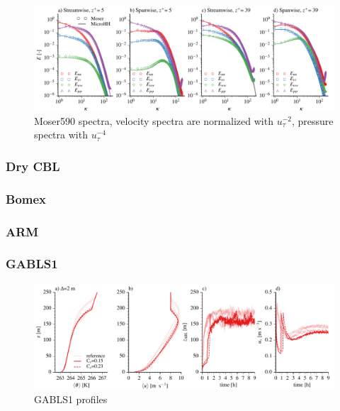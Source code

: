 \documentclass[gmd]{copernicus}
\begin{document}
\begin{figure}[t]
\vspace*{2mm}
\begin{center}
\includegraphics[width=16.6cm]{figs/gmd_m590_spectra_4x1.pdf}
\end{center}
\caption{Moser590 spectra, velocity spectra are normalized with $u_\tau^{-2}$, pressure spectra with $u_\tau^{-4}$}
\end{figure}

\subsubsection{Dry CBL}
\subsubsection{Bomex}
\subsubsection{ARM}
\subsubsection{GABLS1}

\begin{figure}[t]
\vspace*{2mm}
\begin{center}
\includegraphics[width=16.6cm]{figs/gmd_gabls_prof_tser.pdf}
\end{center}
\caption{GABLS1 profiles}
\end{figure}
\end{document}

